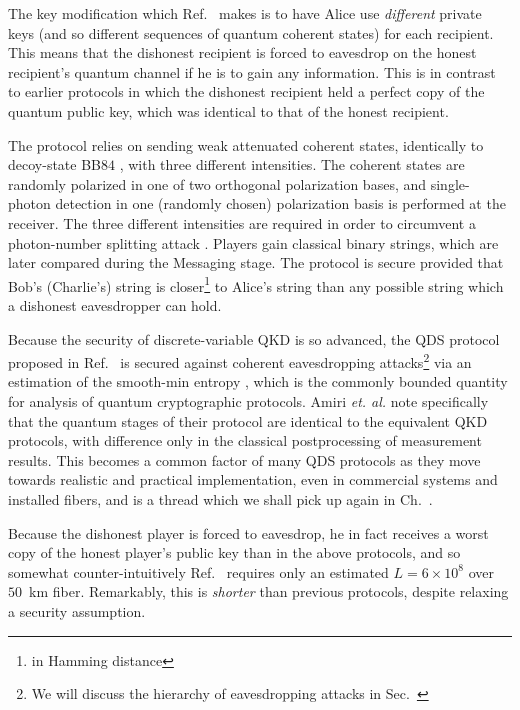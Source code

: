 The key modification which Ref.~\cite{Amiri2016} makes is to have Alice use \emph{different} private keys (and so different sequences of quantum coherent states) for each recipient. This means that the dishonest recipient is forced to eavesdrop on the honest recipient's quantum channel if he is to gain any information. This is in contrast to earlier protocols in which the dishonest recipient held a perfect copy of the quantum public key, which was identical to that of the honest recipient. 



The protocol relies on sending weak attenuated coherent states, identically to decoy-state BB$84$ , with three different intensities. The coherent states are randomly polarized in one of two orthogonal polarization bases, and single-photon detection in one (randomly chosen) polarization basis is performed at the receiver. The three different intensities are required in order to circumvent a photon-number splitting attack . Players gain classical binary strings, which are later compared during the Messaging stage. The protocol is secure provided that Bob's (Charlie's) string is closer\footnote{in Hamming distance} to Alice's string than any possible string which a dishonest eavesdropper can hold. 

Because the security of discrete-variable QKD is so advanced, the QDS protocol proposed in Ref.~\cite{Amiri2016} is secured against coherent eavesdropping attacks\footnote{We will discuss the hierarchy of eavesdropping attacks in Sec.~} via an estimation of the smooth-min entropy , which is the commonly bounded quantity for analysis of quantum cryptographic protocols. Amiri \emph{et. al.} note specifically that the quantum stages of their protocol are identical to the equivalent QKD protocols, with difference only in the classical postprocessing of measurement results. This becomes a common factor of many QDS protocols as they move towards realistic and practical implementation, even in commercial systems and installed fibers, and is a thread which we shall pick up again in Ch.~.

Because the dishonest player is forced to eavesdrop, he in fact receives a worst copy of the honest player's public key than in the above protocols, and so somewhat counter-intuitively Ref.~\cite{Amiri2016} requires only an estimated $L = 6\times 10^8$ over $50$~km fiber. Remarkably, this is \emph{shorter} than previous protocols, despite relaxing a security assumption.

